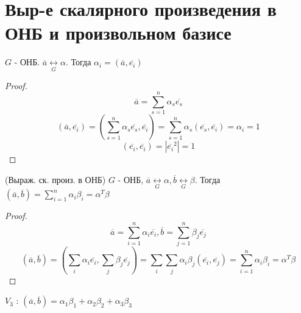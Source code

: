 \section{Выр-е скалярного произведения в ОНБ и произвольном базисе}

\begin{statement}
  $G$ - ОНБ. $\overline{a} \underset{G}{\longleftrightarrow} \alpha$. Тогда $\alpha_i = (\overline{a}, \overline{e_i})$
\end{statement}
\begin{proof}
\[
\overline{a} = \sum_{s = 1}^{n}  \alpha_s \overline{e_s}
\]
\[
  (\overline{a}, \overline{e_i}) = (\sum_{s = 1}^{n} \alpha_s \overline{e_s}, \overline{e_i}) = \sum_{s = 1}^{n}  \alpha_s (\overline{e_s}, \overline{e_i}) = \alpha_i = 1
\] 
\[
  (\overline{e_i}, \overline{e_i}) = |\overline{e_i}^{2}| = 1
\] 
\end{proof}
\begin{theorem} (Выраж. ск. произ. в ОНБ)
$G$ - ОНБ, $\overline{a} \underset{G}{\longleftrightarrow}\alpha, \overline{b} \underset{G}{\longleftrightarrow} \beta$. Тогда $(\overline{a}, \overline{b}) = \sum_{i = 1}^{n}  \alpha_i \beta_i = \alpha^{T} \beta$
\end{theorem}

\begin{proof}
  \[
  \overline{a} = \sum_{i = 1}^{n} \alpha_i \overline{e_i}, \overline{b} = \sum_{j = 1}^{n} \beta_j \overline{e_j}
  \] 
  \[
    (\overline{a}, \overline{b}) = (\sum_{i}^{} \alpha_i \overline{e_i}, \sum_{j}^{} \beta_j \overline{e_j}) = \sum_{i}^{} \sum_{j}^{} \alpha_i \beta_j (\overline{e_i}, \overline{e_j}) = \sum_{i = 1}^{n} \alpha_i \beta_i = \alpha^{T} \beta
  \] 
\end{proof}
\begin{note}
$V_3$ : $(\overline{a}, \overline{b}) = \alpha_1 \beta_1 + \alpha_2 \beta_2 + \alpha_3 \beta_3$
\end{note}

